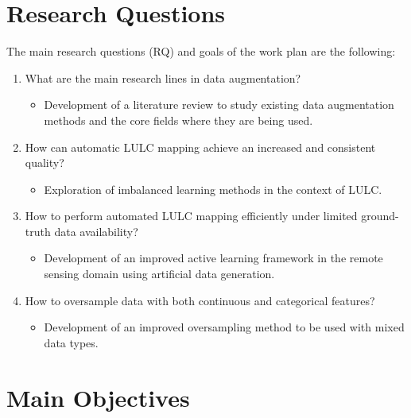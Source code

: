 


\section{Research Questions}

The main research questions (RQ) and goals of the work plan are the following:
\begin{enumerate}
    \item What are the main research lines in data augmentation?
          \begin{itemize}
              \item Development of a literature review to study existing data
                  augmentation methods and the core fields where they are
                  being used.
          \end{itemize}
    \item How can automatic LULC mapping achieve an increased and consistent
        quality?
          \begin{itemize}
              \item Exploration of imbalanced learning methods in the context
                  of LULC\@.
          \end{itemize}
    \item How to perform automated LULC mapping efficiently under limited
        ground-truth data availability?
        \begin{itemize}
            \item Development of an improved active learning framework in the
                remote sensing domain using artificial data generation.
        \end{itemize}
    \item How to oversample data with both continuous and categorical
        features? 
        \begin{itemize}
            \item Development of an improved oversampling method to be used
                with mixed data types.
        \end{itemize}
\end{enumerate}

\section{Main Objectives}~\label{sec:main_objectives}

